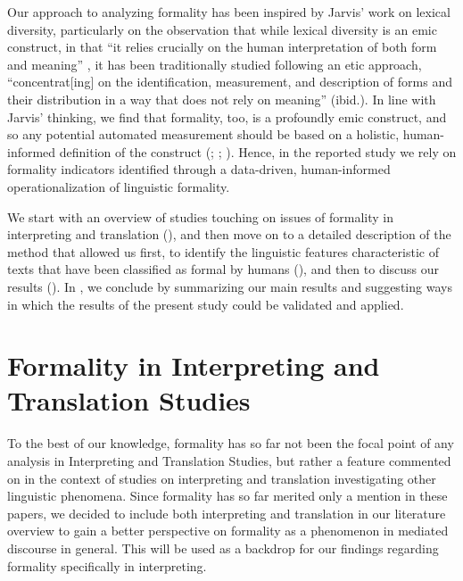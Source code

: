 \documentclass[output=paper]{langscibook}
\begin{document}
Our approach to analyzing formality has been inspired by Jarvis’ work on lexical diversity, particularly on the observation that while lexical diversity is an emic construct, in that “it relies crucially on the human interpretation of both form and meaning” \citep[540]{Jarvis2017}, it has been traditionally studied following an etic approach, “concentrat[ing] on the identification, measurement, and description of forms and their distribution in a way that does not rely on meaning” (ibid.). In line with Jarvis’ thinking, we find that formality, too, is a profoundly emic construct, and so any potential automated measurement should be based on a holistic, human-informed definition of the construct (\citealt{Jarvis2013capturing}; \citealt{Jarvis2013defining}; \citealt{Jarvis2017}). Hence, in the reported study we rely on formality indicators identified through a data-driven, human-informed operationalization of linguistic formality.

We start with an overview of studies touching on issues of formality in interpreting and translation (), and then move on to a detailed description of the method that allowed us first, to identify the linguistic features characteristic of texts that have been classified as formal by humans (), and then to discuss our results (). In , we conclude by summarizing  our main results and suggesting ways in which the results of the present study could be validated and applied.

\section{Formality in Interpreting and Translation Studies}\label{sec:ivaska:2}

To the best of our knowledge, formality has so far not been the focal point of any analysis in Interpreting and Translation Studies, but rather a feature commented on in the context of studies on interpreting and translation investigating other linguistic phenomena. Since formality has so far merited only a mention in these papers, we decided to include both interpreting and translation in our literature overview to gain a better perspective on formality as a phenomenon in mediated discourse in general. This will be used as a backdrop for our findings regarding formality specifically in interpreting.
\end{document}
